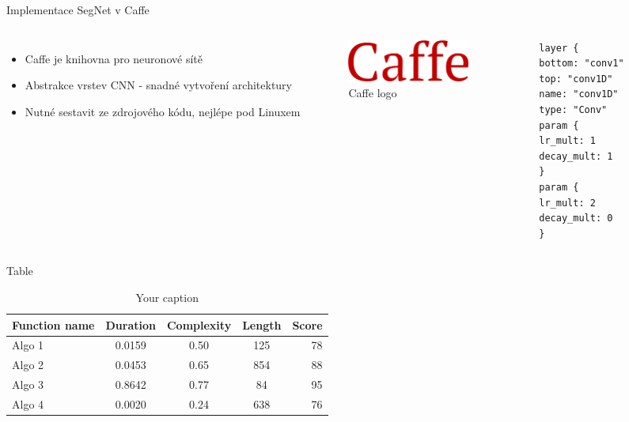 \documentclass[aspectratio=1610]{beamer}
\begin{document}
\begin{frame}[fragile]{Implementace SegNet v Caffe}
	\begin{columns}
		\begin{itemize}	
			\item Caffe je knihovna pro neuronové sítě		
			\item Abstrakce vrstev CNN - snadné vytvoření architektury
			\item Nutné sestavit ze zdrojového kódu, nejlépe pod Linuxem		
		\end{itemize}
		\vspace{5mm}
		\begin{figure}[h]
			\begin{center}
				\includegraphics[width=4cm, keepaspectratio]{caffe-logo.png}
			\end{center}	
			\caption{Caffe logo} 	
		\end{figure}
	
\begin{lstlisting}
	layer {
	bottom: "conv1"
	top: "conv1D"
	name: "conv1D"
	type: "Conv"
	param {
	lr_mult: 1
	decay_mult: 1
	}
	param {
	lr_mult: 2
	decay_mult: 0
	}			
	\end{lstlisting}		
	\end{columns}
\end{frame}
\begin{frame}{Table}
\begin{center}
\begin{table}
\caption{Your caption}
\begin{tabular}{l | c | c | c | r}
\textbf{Function name} & \textbf{Duration} & \textbf{Complexity} & \textbf{Length} & \textbf{Score}\\
\hline \hline
Algo 1 & 0.0159 & 0.50 & 125 & 78 \\
Algo 2 & 0.0453 & 0.65 & 854 & 88 \\
Algo 3 & 0.8642 & 0.77 &  84 & 95 \\
Algo 4 & 0.0020 & 0.24 & 638 & 76 \\
\end{tabular}
\end{table}
\end{center}
\end{frame}
\end{document}
